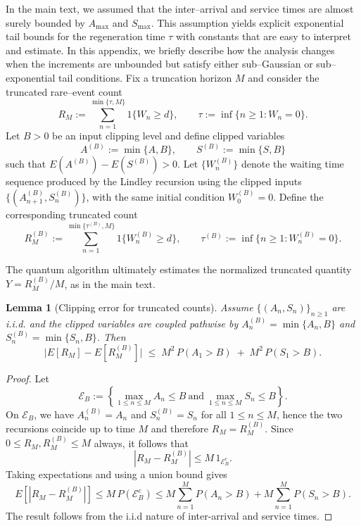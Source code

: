 \documentclass[11pt]{article}
\newtheorem{lemma}{Lemma}
\begin{document}
In the main text, we assumed that the
inter--arrival and service times are almost surely bounded by
$A_{\max}$ and $S_{\max}$.
This assumption yields explicit exponential tail
bounds for the regeneration time $\tau$ with constants that are easy to
interpret and estimate.
In this appendix, we briefly describe how the analysis changes when the
increments are unbounded but satisfy either sub--Gaussian or sub--exponential
tail conditions.
Fix a truncation horizon $M$ and consider the truncated rare--event
count
\[
R_M := \sum_{n=1}^{\min\{\tau,M\}} {1}\{W_n \ge d\},
\qquad
\tau := \inf\{n\ge 1: W_n=0\}.
\]
Let $B>0$ be an input clipping level and define clipped variables
\[
A^{(B)} := \min\{A,B\},\qquad S^{(B)} := \min\{S,B\}
\]
such that $E(A^{(B)})-E(S^{(B)})>0.$
Let $\{W_n^{(B)}\}$ denote the waiting time sequence produced by the Lindley
recursion using the clipped inputs $\{(A_{n+1}^{(B)},S_n^{(B)})\}$, with the same
initial condition $W_0^{(B)}=0$.
Define the corresponding truncated count
\[
R_M^{(B)} := \sum_{n=1}^{\min\{\tau^{(B)},M\}} {1}\{W_n^{(B)} \ge d\},
\qquad
\tau^{(B)} := \inf\{n\ge 1: W_n^{(B)}=0\}.
\]

The quantum algorithm ultimately estimates the normalized truncated quantity
$Y = R_M^{(B)} / M$, as in the main text.
\begin{lemma}[Clipping error for truncated counts]
\label{lem:clip-general}
Assume $\{(A_n,S_n)\}_{n\ge 1}$ are i.i.d. and the clipped variables are coupled
\emph{pathwise} by $A_n^{(B)}=\min\{A_n,B\}$ and $S_n^{(B)}=\min\{S_n,B\}$. Then
\begin{equation}
\label{eq:clip-general}
\bigl|E[R_M]-E[R_M^{(B)}]\bigr|
\;\le\;
M^2\,P(A_1>B) \;+\; M^2\,P(S_1>B).
\end{equation}
\end{lemma}

\begin{proof}
Let
\[
\mathcal{E}_B := \left\{\max_{1\le n\le M} A_n \le B \ \text{and}\ \max_{1\le n\le M} S_n \le B\right\}.
\]
On $\mathcal{E}_B$, we have $A_n^{(B)}=A_n$ and $S_n^{(B)}=S_n$ for all
$1\le n\le M$, hence the two recursions coincide up to time $M$ and therefore
$R_M=R_M^{(B)}$.
Since $0\le R_M,R_M^{(B)}\le M$ always, it follows that
\[
|R_M-R_M^{(B)}|
\le M\,{1}_{\mathcal{E}_B^c}.
\]
Taking expectations and using a union bound gives
\[
E[|R_M-R_M^{(B)}|]
\le M\,P(\mathcal{E}_B^c)
\le M\sum_{n=1}^M P(A_n>B) + M\sum_{n=1}^M P(S_n>B).
\]
The result follows from the i.i.d nature of inter-arrival and service times.
\end{proof}
\end{document}
